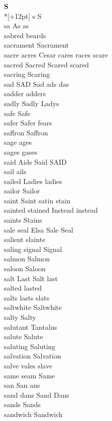 \vspace{14pt}
\noindent\textbf{\Large S}\\*[+12pt]
s S\\
sa As as\\
sabred beards\\
sacrament Sacrament\\
sacre acres Cesar cares races scare\\
sacred Sacred Scared scared\\
sacring Scaring\\
sad SAD Sad ads das\\
sadder adders\\
sadly Sadly Ladys\\
safe Safe\\
safer Safer fears\\
saffron Saffron\\
sage ages\\
sages gases\\
said Aids Said SAID\\
sail ails\\
sailed Ladies ladies\\
sailor Sailor\\
saint Saint satin stain\\
sainted stained Instead instead\\
saints Stains\\
sale seal Elsa Sale Seal\\
salient slainte\\
saling signal Signal\\
salmon Salmon\\
saloon Saloon\\
salt Last Salt last\\
salted lasted\\
salts lasts slats\\
saltwhite Saltwhite\\
salty Salty\\
salutant Tantalus\\
salute Salute\\
saluting Saluting\\
salvation Salvation\\
salve vales slave\\
same seam Same\\
san San ans\\
sand dans Sand Dans\\
sands Sands\\
sandwich Sandwich\\
